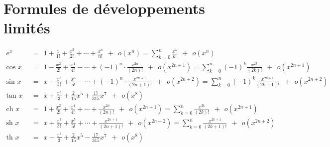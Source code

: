 \documentclass[10pt,class=article,crop=false]{standalone}
\begin{document}
\section{Formules de développements limités}

	


	\begin{align*}
		e^x &\ \ =\ \  1 + \frac{x}{1!}+\frac{x^2}{2!}+ \cdots + \frac{x^n}{n!}\ \  + \ \ o(x^n)
		= \sum_{k=0}^n \frac{x^k}{k!} \ \ + \ \ o(x^n)
		\\[1.2em]
		\text{cos } x &\ \ =\ \
		1 - \frac{x^2}{2!}+\frac{x^4}{4!}- \cdots + (-1)^n \cdot \frac{x^{2n}}{(2n)!}\ \  + \ \ o(x^{2n+1})
		= \sum_{k=0}^n (-1)^{k} \frac{x^{2k}}{(2k)!}  \ \  + \ \ o(x^{2n+1})
		\\[0.5em]
		\text{sin } x &\ \ =\ \
		x - \frac{x^3}{3!}+\frac{x^5}{5!}- \cdots + (-1)^n \cdot \frac{x^{2n+1}}{(2n+1)!}\ \  + \ \ o(x^{2n+2})
		= \sum_{k=0}^n (-1)^{k} \frac{x^{2k+1}}{(2k+1)!}  \ \  + \ \ o(x^{2n+2})
		\\[0.5em]
		\text{tan } x &\ \ =\ \
		x +  \frac{x^3}{3} + \frac{2}{15}x^5 + \frac{17}{315}x^7\ \  + \ \ o(x^{8})  \\[1.2em]
		\text{ch } x &\ \ =\ \
		1 + \frac{x^2}{2!}+\frac{x^4}{4!}+ \cdots + \frac{x^{2n}}{(2n)!}\ \  + \ \ o(x^{2n+1})
		= \sum_{k=0}^n \frac{x^{2k}}{(2k)!} \ \  + \ \ o(x^{2n+1})
		\\[0.5em]
		\text{sh } x &\ \ =\ \
		x + \frac{x^3}{3!}+\frac{x^5}{5!}+ \cdots + \frac{x^{2n+1}}{(2n+1)!}\ \  + \ \ o(x^{2n+2})
		= \sum_{k=0}^n \frac{x^{2k+1}}{(2k+1)!} \ \  + \ \ o(x^{2n+2})
		\\[0.5em]
		\text{th } x &\ \ =\ \
		x -  \frac{x^3}{3} + \frac{2}{15}x^5 - \frac{17}{315}x^7\ \  + \ \ o(x^{8})
		\\[0.5em]
	\end{align*}
\end{document}
